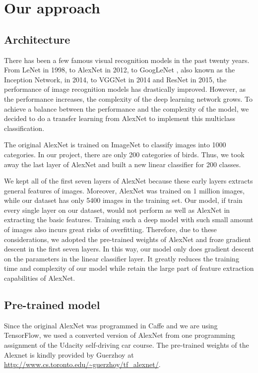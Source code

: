 \documentclass[letterpaper, 12pt]{article}
\begin{document}
\section{Our approach}
\subsection{Architecture}
There has been a few famous visual recognition models in the past twenty years.
From LeNet \cite{lecun1998gradient} in 1998, to AlexNet \cite{Alex} in 2012,
to GoogLeNet \cite{szegedy2015going}, also known as the Inception Network, in 2014,
to VGGNet \cite{simonyan2014very} in 2014 and ResNet \cite{he2016deep} in 2015, the
performance of image recognition models has drastically improved. However, as the performance
increases, the complexity of the deep learning network grows. To achieve a balance between
the performance and the complexity of the model, we decided to do a transfer learning
from AlexNet to implement this multiclass classification.

The original AlexNet is trained on ImageNet to classify images into 1000 categories.
In our project, there are only 200 categories of birds. Thus, we took away the last layer
of AlexNet and built a new linear classifier for 200 classes.

We kept all of the first seven layers of AlexNet because these early layers extracts general
features of images. Moreover, AlexNet was trained on 1 million images, while our dataset has only 5400
images in the training set. Our model, if train every single layer on our dataset, would not perform as
well as AlexNet in extracting the basic features. Training such a deep model with such small amount of
images also incurs great risks of overfitting. Therefore, due to these considerations, we adopted the
pre-trained weights of AlexNet and froze gradient descent in the first seven layers. In this way, our model
only does gradient descent on the parameters in the linear classifier layer. It greatly reduces the
training time and complexity of our model while retain the large part of feature extraction capabilities of
AlexNet.

\subsection{Pre-trained model}
Since the original AlexNet was programmed in Caffe and we are using TensorFlow, we used a converted version of AlexNet from
one programming assignment of the Udacity self-driving car course. The pre-trained weights of the Alexnet is kindly provided by Guerzhoy
at \url{http://www.cs.toronto.edu/~guerzhoy/tf_alexnet/}.
\end{document}
